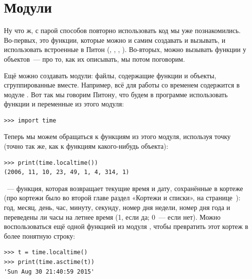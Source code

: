 \vspace{6pt}
\begin{center}
\end{center}

\section{Модули}

Ну что ж, с парой способов повторно использовать код мы уже познакомились. Во-первых, это функции, которые можно и самим создавать и вызывать, и использовать встроенные в Питон (, , , ). Во-вторых, можно вызывать функции у объектов — про то, как их описывать, мы потом поговорим.

Ещё можно создавать модули: файлы, содержащие функции и объекты, сгруппированные вместе. Например, всё для работы со временем содержится в модуле . Вот так мы говорим Питону, что будем в программе использовать функции и переменные из этого модуля:

\begin{listing}
\begin{verbatim}
>>> import time
\end{verbatim}
\end{listing}

Теперь мы можем обращаться к функциям из этого модуля, используя точку (точно так же, как к функциям какого-нибудь объекта):

\begin{listing}
\begin{verbatim}
>>> print(time.localtime())
(2006, 11, 10, 23, 49, 1, 4, 314, 1)
\end{verbatim}
\end{listing}

 — функция, которая возвращает текущие время и дату, сохранённые в кортеже (про кортежи было во второй главе раздел «Кортежи и списки», на странице \pageref{tuplesandlists}): год, месяц, день, час, минуту, секунду, номер дня недели, номер дня года и переведены ли часы на летнее время (1, если да; 0 — если нет). Можно воспользоваться ещё одной функцией из модуля , чтобы превратить этот кортеж в более понятную строку:

\begin{listing}
\begin{verbatim}
>>> t = time.localtime()
>>> print(time.asctime(t))
'Sun Aug 30 21:40:59 2015'
\end{verbatim}
\end{listing}

